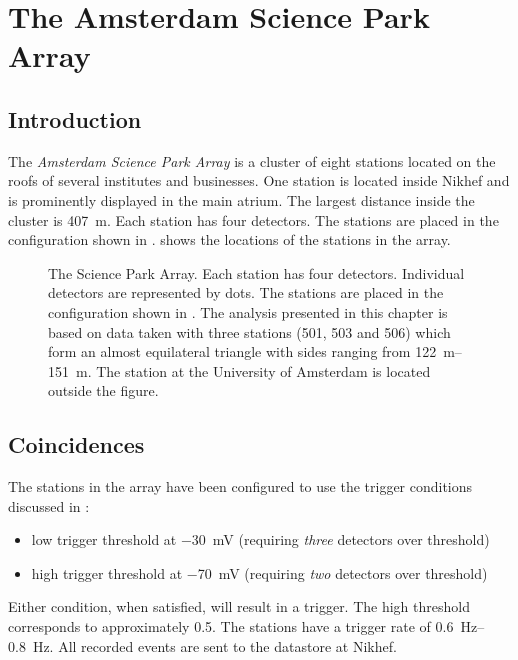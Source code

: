 \chapter{The Amsterdam Science Park Array}
\label{ch:sciencepark}

\section{Introduction}

The \emph{Amsterdam Science Park Array} is a cluster of eight \hisparc stations
located on the roofs of several institutes and businesses.  One station is
located inside Nikhef and is prominently displayed in the main atrium.  The
largest distance inside the cluster is \SI{407}{\meter}. Each station has four
detectors. The stations are placed in the configuration shown in
.  shows the locations
of the stations in the array.

\begin{figure}
\centering

\caption{The Science Park Array. Each station has four detectors.
Individual detectors are represented by dots. The stations are placed in
the configuration shown in . The analysis
presented in this chapter is based on data taken with three stations (501,
503 and 506) which form an almost equilateral triangle with sides ranging
from \SIrange{122}{151}{\meter}.  The station at the University of
Amsterdam is located outside the figure.}
\label{fig:sciencepark-layout}
\end{figure}


\section{Coincidences}

The stations in the array have been configured to use the trigger conditions
discussed in :
\begin{itemize}
    \item low trigger threshold at \SI{-30}{\milli\volt} (requiring \emph{three}
    detectors over threshold)
    \item high trigger threshold at \SI{-70}{\milli\volt} (requiring \emph{two}
    detectors over threshold)
\end{itemize}
Either condition, when satisfied, will result in a trigger. The high threshold
corresponds to approximately \SI{.5}{\mip}.
The stations have a trigger rate of \SIrange{.6}{.8}{\hertz}. All recorded events are sent to
the datastore at Nikhef.

